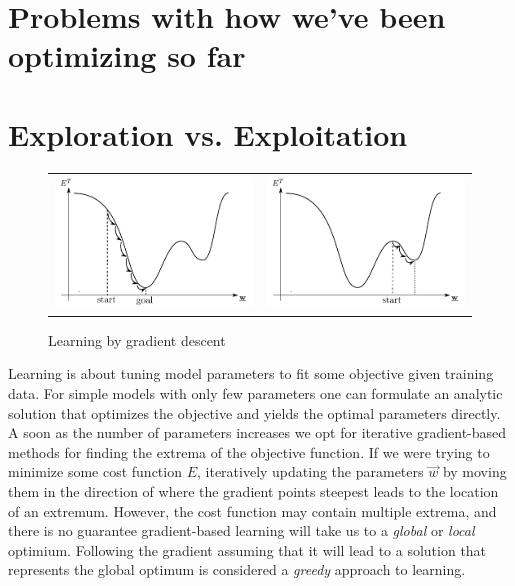 \section{Problems with how we've been optimizing so far}

\section{Exploration vs. Exploitation}
\begin{frame}

\begin{figure}[ht]
  \centering
  \begin{tabular}{c c}
      \includegraphics[height=3.5cm]{img/gradient-descent.pdf} &
      \includegraphics[height=3.5cm]{img/gradient-descent_local.pdf}
  \end{tabular}
  \caption{Learning by gradient descent}\label{fig:graddescent}
\end{figure}

\end{frame}


Learning is about tuning model parameters to fit some objective given training data. 
For simple models with only few parameters one can formulate an analytic solution that optimizes the objective and yields the optimal parameters directly. 
A soon as the number of parameters increases we opt for iterative gradient-based methods for finding the extrema of the objective function. If we were trying to minimize some cost function $E$, 
iteratively updating the parameters $\vec w$ by moving them in the direction of where the gradient points steepest leads to the location of an extremum. 
However, the cost function may contain multiple extrema, and there is no guarantee gradient-based learning will take us to a \emph{global} or \emph{local} optimium. 
Following the gradient assuming that it will lead to a solution that represents the global optimum is considered a \emph{greedy} approach to learning. 

